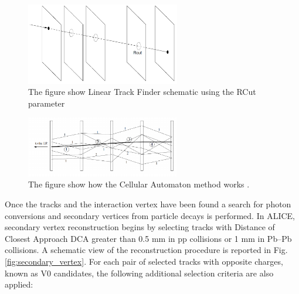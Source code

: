 \documentclass[12pt,a4paper]{book}
\begin{document}
\begin{figure}
	\centering
		\includegraphics[width=0.6\textwidth]{pictures/linear_track.png}
		\caption{The figure show Linear Track Finder schematic using the RCut parameter \cite{CERN-LHCC-2015-001}}
		\label{fig:linear_track}
	\end{figure}
	\begin{figure}
		\centering
		\includegraphics[width=0.6\textwidth]{pictures/CA_track.png}
		\caption{The figure show how the Cellular Automaton method works \cite{CERN-LHCC-2015-001}.}
		\label{fig:CA_track}
\end{figure}


Once the tracks and the interaction vertex have been found a search for photon conversions and secondary vertices from particle decays is performed. In ALICE, secondary vertex reconstruction begins by selecting tracks with Distance of Closest Approach DCA greater than 0.5 mm in pp collisions or 1 mm in Pb–Pb collisions. A schematic view of the reconstruction procedure is reported in Fig. \ref{fig:secondary_vertex}. For each pair of selected tracks with opposite charges, known as V0 candidates, the following additional selection criteria are also applied:
\end{document}
